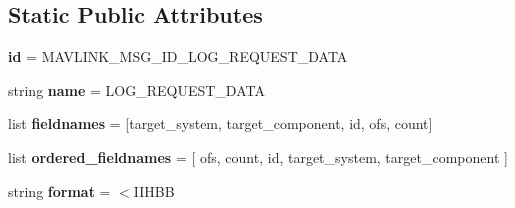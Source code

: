 \subsection*{Static Public Attributes}
\begin{DoxyCompactItemize}
\item 
\mbox{\label{classpymavlink_1_1dialects_1_1v10_1_1MAVLink__log__request__data__message_aeec5eb0d1ec426ca2b8cef6a1cdfdd9c}} 
{\bfseries id} = M\+A\+V\+L\+I\+N\+K\+\_\+\+M\+S\+G\+\_\+\+I\+D\+\_\+\+L\+O\+G\+\_\+\+R\+E\+Q\+U\+E\+S\+T\+\_\+\+D\+A\+TA
\item 
\mbox{\label{classpymavlink_1_1dialects_1_1v10_1_1MAVLink__log__request__data__message_a931c7b419aa887f54449cdbcdceafab6}} 
string {\bfseries name} = \textquotesingle{}L\+O\+G\+\_\+\+R\+E\+Q\+U\+E\+S\+T\+\_\+\+D\+A\+TA\textquotesingle{}
\item 
\mbox{\label{classpymavlink_1_1dialects_1_1v10_1_1MAVLink__log__request__data__message_a05faba5852142674345eef6ff6da26ee}} 
list {\bfseries fieldnames} = \mbox{[}\textquotesingle{}target\+\_\+system\textquotesingle{}, \textquotesingle{}target\+\_\+component\textquotesingle{}, \textquotesingle{}id\textquotesingle{}, \textquotesingle{}ofs\textquotesingle{}, \textquotesingle{}count\textquotesingle{}\mbox{]}
\item 
\mbox{\label{classpymavlink_1_1dialects_1_1v10_1_1MAVLink__log__request__data__message_a021d6ccf9bf93e1c68af1600bc615173}} 
list {\bfseries ordered\+\_\+fieldnames} = \mbox{[} \textquotesingle{}ofs\textquotesingle{}, \textquotesingle{}count\textquotesingle{}, \textquotesingle{}id\textquotesingle{}, \textquotesingle{}target\+\_\+system\textquotesingle{}, \textquotesingle{}target\+\_\+component\textquotesingle{} \mbox{]}
\item 
\mbox{\label{classpymavlink_1_1dialects_1_1v10_1_1MAVLink__log__request__data__message_ac2bce86d24a7224d4fb4cf30f384d3d7}} 
string {\bfseries format} = \textquotesingle{}$<$I\+I\+H\+BB\textquotesingle{}

\end{DoxyCompactItemize}
